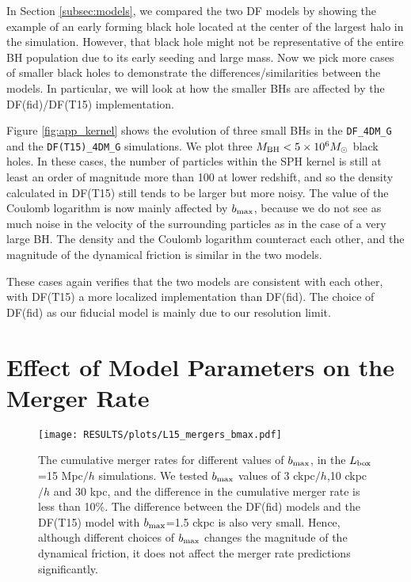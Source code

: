 In Section \ref{subsec:models}, we compared the two DF models by showing the example of an early forming black hole located at the center of the largest halo in the simulation. However, that black hole might not be representative of the entire BH population due to its early seeding and large mass. Now we pick more cases of smaller black holes to demonstrate the differences/similarities between the models. In particular, we will look at how the smaller BHs are affected by the DF(fid)/DF(T15) implementation.

Figure \ref{fig:app_kernel} shows the evolution of three small BHs in the \texttt{DF\_4DM\_G} and the \texttt{DF(T15)\_4DM\_G} simulations. We plot three $M_{\rm BH}<5\times 10^6 M_\odot$ black holes. In these cases, the number of particles within the SPH kernel is still at least an order of magnitude more than 100 at lower redshift, and so the density calculated in DF(T15) still tends to be larger but more noisy. The value of the Coulomb logarithm is now mainly affected by $b_{\rm max}$, because we do not see as much noise in the velocity of the surrounding particles as in the case of a very large BH. The density and the Coulomb logarithm counteract each other, and the magnitude of the dynamical friction is similar in the two models. 

These cases again verifies that the two models are consistent with each other, with DF(T15) a more localized implementation than DF(fid). The choice of DF(fid) as our fiducial model is mainly due to our resolution limit.


\section{Effect of Model Parameters on the Merger Rate}
\label{app:merger_param}
\begin{figure}
\texttt{[image: RESULTS/plots/L15\_mergers\_bmax.pdf]}

\caption{The cumulative merger rates for different values of $b_{\rm max}$, in the $L_{\rm  box}$=15 Mpc$/h$ simulations. We tested $b_{\rm max}$ values of 3 ckpc$/h$,10 ckpc$/h$ and 30 kpc, and the difference in the cumulative merger rate is less than 10\%. The difference between the DF(fid) models and the DF(T15) model with $b_{\rm max}$=1.5 ckpc is also very small. Hence, although different choices of $b_{\rm max}$ changes the magnitude of the dynamical friction, it does not affect the merger rate predictions significantly.}
\label{fig:merger_bmax}
\end{figure}

